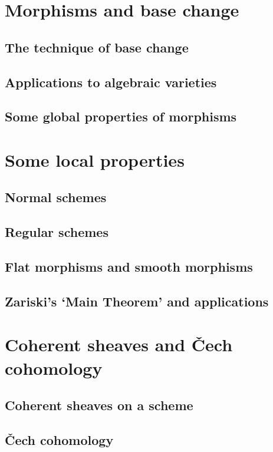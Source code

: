 \documentclass[oneside]{amsbook}
\begin{document}
\chapter{Morphisms and base change}
\section{The technique of base change}

\section{Applications to algebraic varieties}

\section{Some global properties of morphisms}


\chapter{Some local properties}
\section{Normal schemes}

\section{Regular schemes}

\section{Flat morphisms and smooth morphisms}

\section{Zariski's `Main Theorem' and applications}


\chapter{Coherent sheaves and Čech cohomology}
\section{Coherent sheaves on a scheme}

\section{Čech cohomology}

\end{document}
